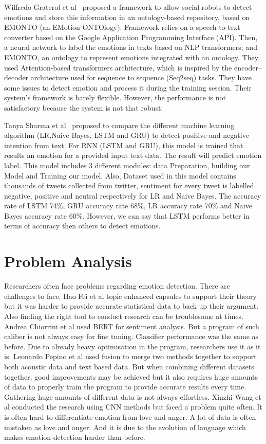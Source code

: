 Wilfredo Graterol et al~\cite{ref7} proposed a framework to allow social robots to detect emotions and store this information in an ontology-based repository, based on EMONTO (an EMotion ONTOlogy). Framework relies on a speech-to-text converter based on the Google Application Programming Interface (API). Then, a neural network to label the emotions in texts based on NLP transformers; and EMONTO, an ontology to represent emotions integrated with an ontology. They used Attention-based transformers architecture, which is inspired by the encoder–decoder architecture used for sequence to sequence (Seq2seq) tasks. They have some issues to detect emotion and process it during the training session. Their system's framework is barely flexible. However, the performance is not satisfactory because the system is not that robust.


Tanya Sharma et al~\cite{ref8} proposed to compare the different machine learning algorithm (LR,Naive Bayes, LSTM and GRU) to detect positive and negative intention from text. For RNN (LSTM and GRU), this model is trained that results an emotion for a provided input text data. The result will predict emotion label. This model includes 3 different modules: data Preparation, building our Model and Training our model. Also, Dataset used in this model contains thousands of tweets collected from twitter, sentiment for every tweet is labelled negative, positive and neutral respectively for LR and Naive Bayes. The accuracy rate of LSTM 74\%, GRU accuracy rate 68\%, LR accuracy rate 70\% and Naive Bayes accuracy rate 60\%. However, we can say that LSTM performs better in terms of accuracy then others to detect emotions.

\section{Problem Analysis}
Researchers often face problems regarding emotion detection. There are challenges to face. Hao Fei et al topic enhanced capsules to support their theory but it was harder to provide accurate statistical data to back up their argument. Also finding the right tool to conduct research can be troublesome at times. Andrea Chiorrini et al used BERT for sentiment analysis. But a program of such caliber is not always easy for fine tuning. Classifier performance was the same as before. Due to already heavy optimisation in the program, researchers use it as it is. Leonardo Pepino et al used fusion to merge two methods together to support both acoustic data and text based data. But when combining different datasets together, good improvements may be achieved but it also requires huge amounts of data to properly train the program to provide accurate results every time. Gathering huge amounts of different data is not always effortless. Xinzhi Wang et al conducted the research using CNN methods but faced a problem quite often. It is often hard to differentiate emotion from love and anger. A lot of data is often mistaken as love and anger. And it is due to the evolution of language which makes emotion detection harder than before.


